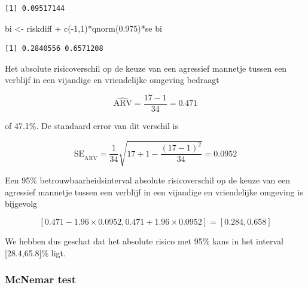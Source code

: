 \documentclass[
  dutch,
  letterpaper,
  12pt]{book}
\newenvironment{Shaded}{\begin{snugshade}}{\end{snugshade}}
\newcommand{\DecValTok}[1]{\textcolor[rgb]{0.68,0.00,0.00}{#1}}
\newcommand{\FloatTok}[1]{\textcolor[rgb]{0.68,0.00,0.00}{#1}}
\newcommand{\FunctionTok}[1]{\textcolor[rgb]{0.28,0.35,0.67}{#1}}
\newcommand{\NormalTok}[1]{\textcolor[rgb]{0.00,0.23,0.31}{#1}}
\newcommand{\OtherTok}[1]{\textcolor[rgb]{0.00,0.23,0.31}{#1}}
\newcommand{\SpecialCharTok}[1]{\textcolor[rgb]{0.37,0.37,0.37}{#1}}
\theoremstyle{definition}
\theoremstyle{definition}
\theoremstyle{definition}
\theoremstyle{remark}
\begin{document}
\begin{verbatim}
[1] 0.09517144
\end{verbatim}

\begin{Shaded}
\begin{Highlighting}[]
\NormalTok{bi }\OtherTok{\textless{}{-}}\NormalTok{ riskdiff }\SpecialCharTok{+} \FunctionTok{c}\NormalTok{(}\SpecialCharTok{{-}}\DecValTok{1}\NormalTok{,}\DecValTok{1}\NormalTok{)}\SpecialCharTok{*}\FunctionTok{qnorm}\NormalTok{(}\FloatTok{0.975}\NormalTok{)}\SpecialCharTok{*}\NormalTok{se}
\NormalTok{bi}
\end{Highlighting}
\end{Shaded}

\begin{verbatim}
[1] 0.2840556 0.6571208
\end{verbatim}

Het absolute risicoverschil op de keuze van een agressief mannetje
tussen een verblijf in een vijandige en vriendelijke omgeving bedraagt

\begin{equation*}
\widehat{\text{ARV}}=\frac{17-1}{34}=0.471
\end{equation*}

of 47.1\%. De standaard error van dit verschil is

\begin{equation*}
\text{SE}_{\widehat{\text{ARV}}}=\frac{1}{34}\sqrt{17+1-\frac{(17-1)^2}{34}}=0.0952
\end{equation*}

Een 95\% betrouwbaarheidsinterval absolute risicoverschil op de keuze
van een agressief mannetje tussen een verblijf in een vijandige en
vriendelijke omgeving is bijgevolg

\begin{equation*}
\left[0.471-1.96\times 0.0952,0.471+1.96\times 0.0952\right]=[0.284,0.658]
\end{equation*}

We hebben dus geschat dat het absolute risico met 95\% kans in het
interval {[}28.4,65.8{]}\% ligt.

\subsubsection{McNemar test}\label{mcnemar-test}
\end{document}
